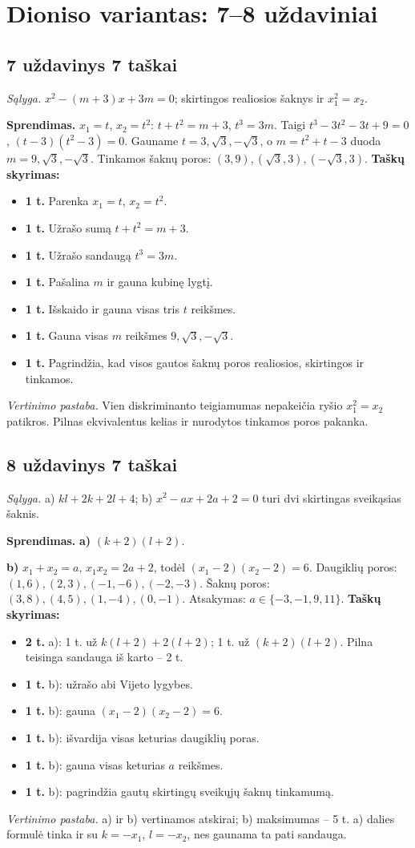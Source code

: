\documentclass[11pt,a4paper]{article}
\newcommand{\uzd}[3]{\subsection*{#1 uždavinys \hfill #2 taškai}\textit{Sąlyga.} #3\par}
\newcommand{\kriterijai}{\textbf{Taškų skyrimas:}}
\newcommand{\balas}[2]{\item \textbf{#1 t.} #2}
\begin{document}
\section*{Dioniso variantas: 7--8 uždaviniai}
\uzd{7}{7}{$x^2-(m+3)x+3m=0$; skirtingos realiosios šaknys ir $x_1^2=x_2$.}
\textbf{Sprendimas.} $x_1=t$, $x_2=t^2$: $t+t^2=m+3$, $t^3=3m$. Taigi $t^3-3t^2-3t+9=0$, $(t-3)(t^2-3)=0$. Gauname $t=3,\sqrt3,-\sqrt3$, o $m=t^2+t-3$ duoda $m=9,\sqrt3,-\sqrt3$. Tinkamos šaknų poros: $(3,9),(\sqrt3,3),(-\sqrt3,3)$.
\kriterijai\begin{itemize}
\balas{1}{Parenka $x_1=t$, $x_2=t^2$.}
\balas{1}{Užrašo sumą $t+t^2=m+3$.}
\balas{1}{Užrašo sandaugą $t^3=3m$.}
\balas{1}{Pašalina $m$ ir gauna kubinę lygtį.}
\balas{1}{Išskaido ir gauna visas tris $t$ reikšmes.}
\balas{1}{Gauna visas $m$ reikšmes $9,\sqrt3,-\sqrt3$.}
\balas{1}{Pagrindžia, kad visos gautos šaknų poros realiosios, skirtingos ir tinkamos.}
\end{itemize}
\textit{Vertinimo pastaba.} Vien diskriminanto teigiamumas nepakeičia ryšio $x_1^2=x_2$ patikros. Pilnas ekvivalentus kelias ir nurodytos tinkamos poros pakanka.
\uzd{8}{7}{a) $kl+2k+2l+4$; b) $x^2-ax+2a+2=0$ turi dvi skirtingas sveikąsias šaknis.}
\textbf{Sprendimas.} \textbf{a)} $(k+2)(l+2)$.\par\textbf{b)} $x_1+x_2=a$, $x_1x_2=2a+2$, todėl $(x_1-2)(x_2-2)=6$. Daugiklių poros: $(1,6),(2,3),(-1,-6),(-2,-3)$. Šaknų poros: $(3,8),(4,5),(1,-4),(0,-1)$. Atsakymas: $a\in\{-3,-1,9,11\}$.
\kriterijai\begin{itemize}
\balas{2}{a): 1 t. už $k(l+2)+2(l+2)$; 1 t. už $(k+2)(l+2)$. Pilna teisinga sandauga iš karto -- 2 t.}
\balas{1}{b): užrašo abi Vijeto lygybes.}
\balas{1}{b): gauna $(x_1-2)(x_2-2)=6$.}
\balas{1}{b): išvardija visas keturias daugiklių poras.}
\balas{1}{b): gauna visas keturias $a$ reikšmes.}
\balas{1}{b): pagrindžia gautų skirtingų sveikųjų šaknų tinkamumą.}
\end{itemize}
\textit{Vertinimo pastaba.} a) ir b) vertinamos atskirai; b) maksimumas -- 5 t. a) dalies formulė tinka ir su $k=-x_1$, $l=-x_2$, nes gaunama ta pati sandauga.
\end{document}
